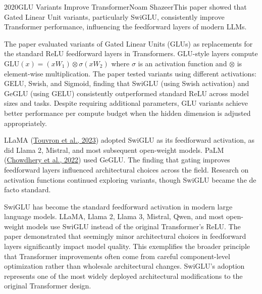 
\begin{papersummary}{2020}{GLU Variants Improve Transformer}{Noam Shazeer}{This paper showed that Gated Linear Unit variants, particularly SwiGLU, consistently improve Transformer performance, influencing the feedforward layers of modern LLMs.}

The paper evaluated variants of Gated Linear Units (GLUs) as replacements for the standard ReLU feedforward layers in Transformers. GLU-style layers compute $\text{GLU}(x) = (xW_1) \otimes \sigma(xW_2)$ where $\sigma$ is an activation function and $\otimes$ is element-wise multiplication. The paper tested variants using different activations: GELU, Swish, and Sigmoid, finding that SwiGLU (using Swish activation) and GeGLU (using GELU) consistently outperformed standard ReLU across model sizes and tasks. Despite requiring additional parameters, GLU variants achieve better performance per compute budget when the hidden dimension is adjusted appropriately.

LLaMA (\hyperref[paper:touvron-2023-llama]{Touvron et al., 2023}) adopted SwiGLU as its feedforward activation, as did Llama 2, Mistral, and most subsequent open-weight models. PaLM (\hyperref[paper:chowdhery-2022]{Chowdhery et al., 2022}) used GeGLU. The finding that gating improves feedforward layers influenced architectural choices across the field. Research on activation functions continued exploring variants, though SwiGLU became the de facto standard.

SwiGLU has become the standard feedforward activation in modern large language models. LLaMA, Llama 2, Llama 3, Mistral, Qwen, and most open-weight models use SwiGLU instead of the original Transformer's ReLU. The paper demonstrated that seemingly minor architectural choices in feedforward layers significantly impact model quality. This exemplifies the broader principle that Transformer improvements often come from careful component-level optimization rather than wholesale architectural changes. SwiGLU's adoption represents one of the most widely deployed architectural modifications to the original Transformer design.

\end{papersummary}
